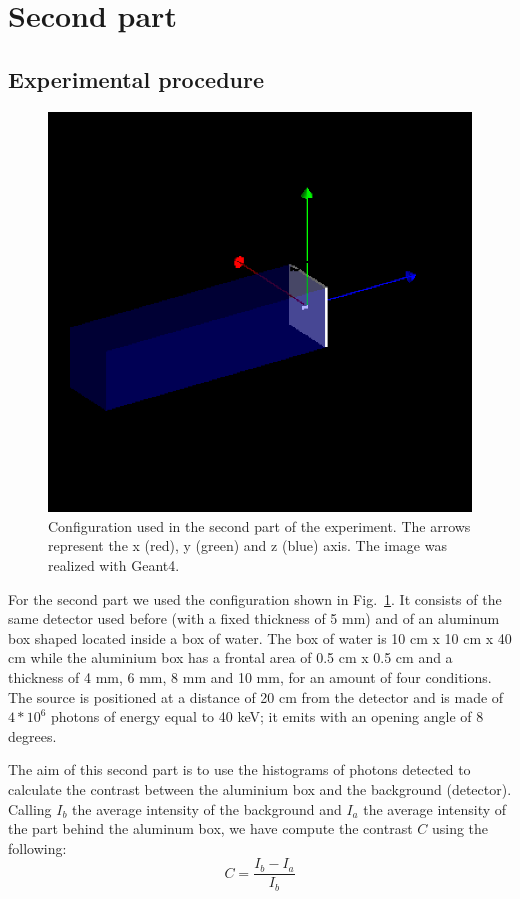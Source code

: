 \documentclass[a4paper]{article}
\begin{document}
\section{Second part}
\subsection{Experimental procedure}
\begin{figure}[H]
  \centering
  \includegraphics[width=0.6\columnwidth]{detector2.png}
  \caption{Configuration used in the second part of the experiment. The arrows represent the x (red), y (green) and z (blue) axis. The image was realized with Geant4.}
  \label{fig:conf2}
\end{figure}
For the second part we used the configuration shown in Fig.~\ref{fig:conf2}. It consists of the same detector used before (with a fixed thickness of 5 mm) and of an aluminum box shaped located inside a box of water. The box of water is 10 cm x 10 cm x 40 cm while the aluminium box has a frontal area of 0.5 cm x 0.5 cm and a thickness of 4 mm, 6 mm, 8 mm and 10 mm, for an amount of four conditions. The source is positioned at a distance of 20 cm from the detector and is made of $4*10^{6}$ photons of energy equal to 40 keV; it emits with an opening angle of 8 degrees.

The aim of this second part is to use the histograms of photons detected to calculate the contrast between the aluminium box and the background (detector). Calling $I_{b}$ the average intensity of the background and $I_{a}$ the average intensity of the part behind the aluminum box, we have compute the contrast $C$ using the following:
\begin{equation}
  C=\frac{I_{b}-I_{a}}{I_{b}}
  \label{eq:contrast}
\end{equation}
\end{document}
